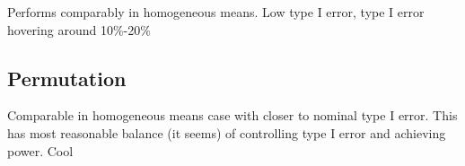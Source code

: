 \documentclass{article}
\begin{document}
Performs comparably in homogeneous means. Low type I error, type I error hovering around 10\%-20\%
%

\subsection{Permutation}

Comparable in homogeneous means case with closer to nominal type I error. This has most reasonable balance (it seems) of controlling type I error and achieving power. Cool

\end{document}
